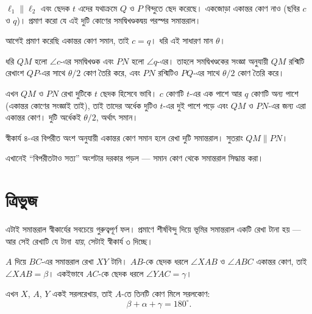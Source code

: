 \documentclass[11pt]{article}
\begin{document}
 $\ell_1 \parallel \ell_2$ এবং ছেদক $t$ এদের যথাক্রমে $Q$ ও $P$ বিন্দুতে
ছেদ করেছে। একজোড়া একান্তর কোণ নাও (ছবির $c$ ও $q$)। প্রমাণ করো যে এই দুটি কোণের
সমদ্বিখণ্ডকদ্বয় পরস্পর সমান্তরাল।

\begin{sol}
আগেই প্রমাণ করেছি একান্তর কোণ সমান, তাই $c = q$। ধরি এই সাধারণ মান $\theta$।

ধরি $QM$ হলো $\angle c$-এর সমদ্বিখণ্ডক এবং $PN$ হলো $\angle q$-এর। তাহলে
সমদ্বিখণ্ডকের সংজ্ঞা অনুযায়ী $QM$ রশ্মিটি রেখাংশ $QP$-এর সাথে $\theta/2$ কোণ
তৈরি করে, এবং $PN$ রশ্মিটিও $PQ$-এর সাথে $\theta/2$ কোণ তৈরি করে।

এখন $QM$ ও $PN$ রেখা দুটিকে $t$ ছেদক হিসেবে ভাবি। $c$ কোণটি $t$-এর এক পাশে আর
$q$ কোণটি অন্য পাশে (একান্তর কোণের সংজ্ঞাই তাই), তাই তাদের অর্ধেক দুটিও $t$-এর
দুই পাশে পড়ে এবং $QM$ ও $PN$-এর জন্য এরা একান্তর কোণ। দুটি অর্ধেকই $\theta/2$,
অর্থাৎ সমান।

স্বীকার্য ৪-এর বিপরীত অংশ অনুযায়ী একান্তর কোণ সমান হলে রেখা দুটি সমান্তরাল।
সুতরাং $QM \parallel PN$।

এখানেই ``বিপরীতটাও সত্য'' অংশটার দরকার পড়ল --- সমান কোণ থেকে সমান্তরাল সিদ্ধান্ত
করা।
\end{sol}

\section{ত্রিভুজ}

\begin{idea}
এটাই সমান্তরাল স্বীকার্যের সবচেয়ে গুরুত্বপূর্ণ ফল। প্রমাণে শীর্ষবিন্দু দিয়ে
ভূমির সমান্তরাল একটি রেখা টানা হয় --- আর সেই রেখাটি যে টানা \emph{যায়}, সেটাই
স্বীকার্য ৩ দিচ্ছে।

\begin{center}
\end{center}

\noindent
$A$ দিয়ে $BC$-এর সমান্তরাল রেখা $XY$ টানি। $AB$-কে ছেদক ধরলে $\angle XAB$ ও
$\angle ABC$ একান্তর কোণ, তাই $\angle XAB = \beta$। একইভাবে $AC$-কে ছেদক ধরলে
$\angle YAC = \gamma$।

এখন $X$, $A$, $Y$ একই সরলরেখায়, তাই $A$-তে তিনটি কোণ মিলে সরলকোণ:
\[
  \beta + \alpha + \gamma = 180^\circ .
\]
\end{idea}
\end{document}
